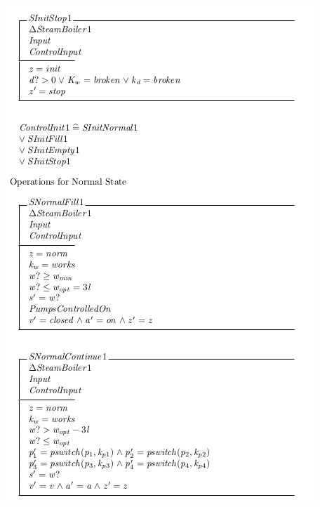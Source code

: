 \begin{center}
    \noindent \includegraphics[scale=0.8]{examples/steamboiler/0g.png}
\end{center}

